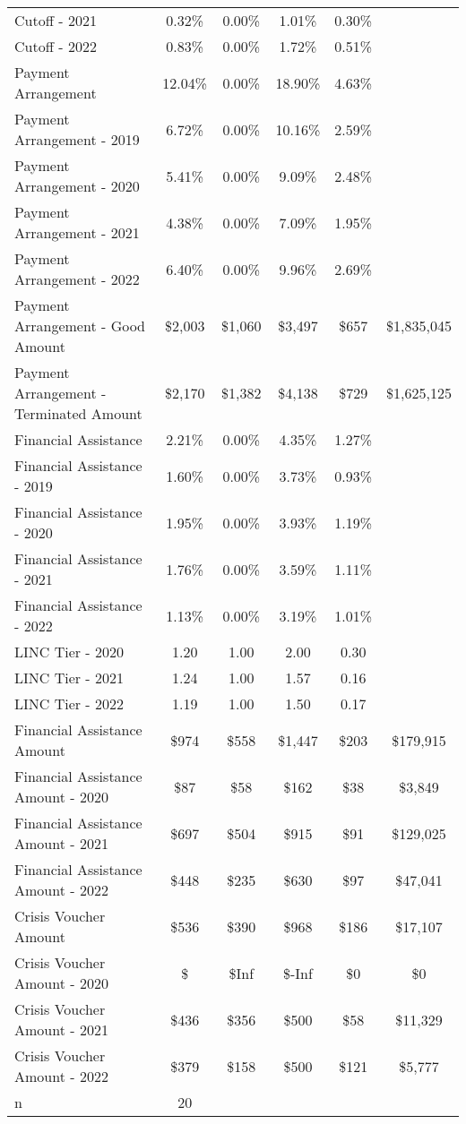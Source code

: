 \begin{tabular}{l|c|c|c|c|c}
\quad Cutoff - 2021 & 0.32\% & 0.00\% & 1.01\% & 0.30\% \\
\quad Cutoff - 2022 & 0.83\% & 0.00\% & 1.72\% & 0.51\% \\
\midrule 
Payment Arrangement & 12.04\% & 0.00\% & 18.90\% & 4.63\% \\
\quad Payment Arrangement - 2019 & 6.72\% & 0.00\% & 10.16\% & 2.59\% \\
\quad Payment Arrangement - 2020 & 5.41\% & 0.00\% & 9.09\% & 2.48\% \\
\quad Payment Arrangement - 2021 & 4.38\% & 0.00\% & 7.09\% & 1.95\% \\
\quad Payment Arrangement - 2022 & 6.40\% & 0.00\% & 9.96\% & 2.69\% \\
\quad Payment Arrangement - Good Amount & \$2,003 & \$1,060 & \$3,497 & \$657 & \$1,835,045 \\
\quad Payment Arrangement - Terminated Amount & \$2,170 & \$1,382 & \$4,138 & \$729 & \$1,625,125 \\
\midrule 
Financial Assistance & 2.21\% & 0.00\% & 4.35\% & 1.27\% \\
\quad Financial Assistance - 2019 & 1.60\% & 0.00\% & 3.73\% & 0.93\% \\
\quad Financial Assistance - 2020 & 1.95\% & 0.00\% & 3.93\% & 1.19\% \\
\quad Financial Assistance - 2021 & 1.76\% & 0.00\% & 3.59\% & 1.11\% \\
\quad Financial Assistance - 2022 & 1.13\% & 0.00\% & 3.19\% & 1.01\% \\
\midrule 
LINC Tier - 2020 & 1.20 & 1.00 & 2.00 & 0.30 \\
LINC Tier - 2021 & 1.24 & 1.00 & 1.57 & 0.16 \\
LINC Tier - 2022 & 1.19 & 1.00 & 1.50 & 0.17 \\
\midrule 
Financial Assistance Amount & \$974 & \$558 & \$1,447 & \$203 & \$179,915 \\
\quad Financial Assistance Amount - 2020 & \$87 & \$58 & \$162 & \$38 & \$3,849 \\
\quad Financial Assistance Amount - 2021 & \$697 & \$504 & \$915 & \$91 & \$129,025 \\
\quad Financial Assistance Amount - 2022 & \$448 & \$235 & \$630 & \$97 & \$47,041 \\
\midrule 
Crisis Voucher Amount & \$536 & \$390 & \$968 & \$186 & \$17,107 \\
\quad Crisis Voucher Amount - 2020 & \$ & \$Inf & \$-Inf & \$0 & \$0 \\
\quad Crisis Voucher Amount - 2021 & \$436 & \$356 & \$500 & \$58 & \$11,329 \\
\quad Crisis Voucher Amount - 2022 & \$379 & \$158 & \$500 & \$121 & \$5,777 \\
\midrule 
n & 20 &  &  &  &  \\
\midrule 
\bottomrule 
\end{tabular}
